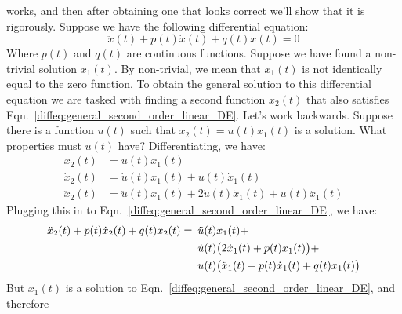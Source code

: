             works, and then after obtaining one that looks correct
            we'll show that it is rigorously. Suppose we have the
            following differential equation:
            \begin{equation}
                \label{diffeq:general_second_order_linear_DE}
                \ddot{x}(t)+p(t)\dot{x}(t)+q(t)x(t)=0
            \end{equation}
            Where $p(t)$ and $q(t)$ are continuous functions. Suppose we
            have found a non-trivial solution $x_{1}(t)$. By non-trivial,
            we mean that $x_{1}(t)$ is not identically equal to the
            zero function. To obtain the general solution to this
            differential equation we are tasked with finding a second
            function $x_{2}(t)$ that also satisfies
            Eqn.~\ref{diffeq:general_second_order_linear_DE}. Let's work
            backwards. Suppose there is a function $u(t)$ such that
            $x_{2}(t)=u(t)x_{1}(t)$ is a solution. What properties must
            $u(t)$ have? Differentiating, we have:
            \begin{subequations}
                \begin{align}
                    x_{2}(t)&=u(t)x_{1}(t)\\
                    \dot{x}_{2}(t)&=\dot{u}(t)x_{1}(t)+u(t)\dot{x}_{1}(t)\\
                    \ddot{x}_{2}(t)
                    &=\ddot{u}(t)x_{1}(t)+2\dot{u}(t)\dot{x}_{1}(t)
                    +u(t)\ddot{x}_{1}(t)
                \end{align}
            \end{subequations}
            Plugging this in to
            Eqn.~\ref{diffeq:general_second_order_linear_DE}, we have:
            \begin{align}
                \nonumber
                \ddot{x}_{2}(t)+p(t)\dot{x}_{2}(t)+q(t)x_{2}(t)
                =&\hspace{0.5em}\ddot{u}(t)x_{1}(t)+\\
                \nonumber&\hspace{0.5em}
                \dot{u}(t)\big(2\dot{x}_{1}(t)+p(t)x_{1}(t)\big)+\\
                &\hspace{0.5em}
                u(t)\big(\ddot{x}_{1}(t)+p(t)\dot{x}_{1}(t)+q(t)x_{1}(t)\big)
            \end{align}
            But $x_{1}(t)$ is a solution to
            Eqn.~\ref{diffeq:general_second_order_linear_DE}, and therefore
